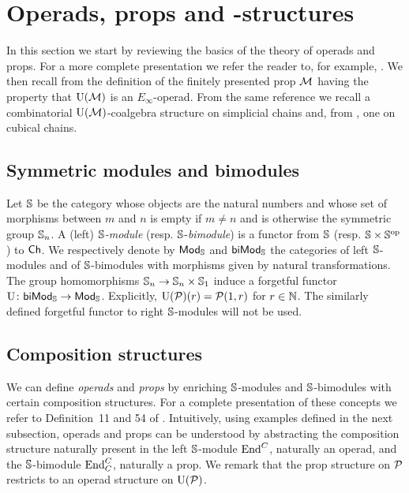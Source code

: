 
\section{Operads, props and \pdfEinfty-structures} \label{s:operads and props}

In this section we start by reviewing the basics of the theory of operads and props.
For a more complete presentation we refer the reader to, for example, \cite{markl2008props}.
We then recall from \cite{medina2020prop1} the definition of the finitely presented prop $\M$ having the property that $\UM$ is an $E_{\infty}$-operad.
From the same reference we recall a combinatorial $\UM$-coalgebra structure on simplicial chains and, from \cite{medina2022cube_einfty}, one on cubical chains.

\subsection{Symmetric modules and bimodules}

Let $\S$ be the category whose objects are the natural numbers and whose set of morphisms between $m$ and $n$ is empty if $m \neq n$ and is otherwise the symmetric group $\S_n$.
A (left) \textit{$\S$-module} (resp. $\S$-\textit{bimodule}) is a functor from $\S$ (resp. $\S \times \S^\op$) to $\Ch$.
We respectively denote by $\Smod$ and $\Sbimod$ the categories of left $\S$-modules and of $\S$-bimodules with morphisms given by natural transformations.
The group homomorphisms $\S_n \to \S_n \times \S_1$ induce a forgetful functor $\forget \colon \Sbimod \to \Smod$.
Explicitly, $\forget(\cP)(r) = \cP(1, r)$ for $r \in \N$.
The similarly defined forgetful functor to right $\S$-modules will not be used.

\subsection{Composition structures}

We can define \textit{operads} and \textit{props} by enriching $\S$-modules and $\S$-bimodules with certain composition structures.
For a complete presentation of these concepts we refer to Definition~11 and 54 of \cite{markl2008props}.
Intuitively, using examples defined in the next subsection, operads and props can be understood by abstracting the composition structure naturally present in the left $\S$-module $\End^C$, naturally an operad, and the $\S$-bimodule $\End^C_C$, naturally a prop.
We remark that the prop structure on $\cP$ restricts to an operad structure on $\forget(\cP)$.

